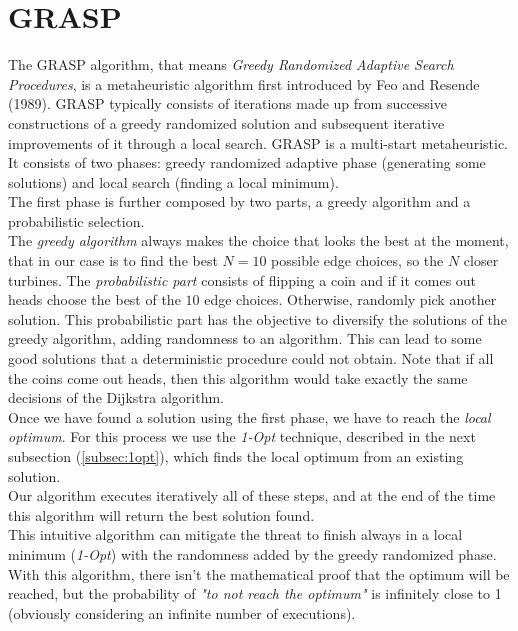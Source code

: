\section{GRASP}
The GRASP algorithm, that means \textit{Greedy Randomized Adaptive Search Procedures}, is a metaheuristic algorithm first introduced by Feo and Resende (1989). GRASP typically consists of iterations made up from successive constructions of a greedy randomized solution and subsequent iterative improvements of it through a local search. GRASP is a multi-start metaheuristic. \\
It consists of two phases: greedy randomized adaptive phase (generating some solutions) and local search (finding a local minimum).\\
The first phase is further composed by two parts, a greedy algorithm and a probabilistic selection.\\
The \textit{greedy algorithm} always makes the choice that looks the best at the moment, that in our case is to find the best $N = 10$ possible edge choices, so the $N$ closer turbines. The \textit{probabilistic part} consists of flipping a coin and if it comes out heads choose the best of the $10$ edge choices. Otherwise, randomly pick another solution. This probabilistic part has the objective to diversify the solutions of the greedy algorithm, adding randomness to an algorithm. This can lead to some good solutions that a deterministic procedure could not obtain. Note that if all the coins come out heads, then this algorithm would take exactly the same decisions of the Dijkstra algorithm.\\
Once we have found a solution using the first phase, we have to reach the \textit{local optimum}. For this process we use the \textit{1-Opt} technique, described in the next subsection (\ref{subsec:1opt}), which finds the local optimum from an existing solution.\\
Our algorithm executes iteratively all of these steps, and at the end of the time this algorithm will return the best solution found. \\
This intuitive algorithm can mitigate the threat to finish always in a local minimum (\textit{1-Opt}) with the randomness added by the greedy randomized phase.\\ 
With this algorithm, there isn't the mathematical proof that the optimum will be reached, but the probability of \textit{"to not reach the optimum"} is infinitely close to 1 (obviously considering an infinite number of executions). 
